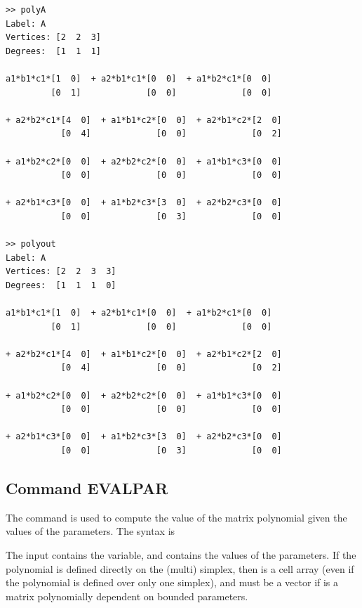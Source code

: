 \documentclass[english,11pt]{article}
\theoremstyle{break} \theorembodyfont{\small\rm}
\begin{document}
\begin{minipage}{13.5cm}
\begin{lstlisting}[rulecolor=\color{red}]
>> polyA
Label: A
Vertices: [2  2  3]
Degrees:  [1  1  1]

a1*b1*c1*[1  0]  + a2*b1*c1*[0  0]  + a1*b2*c1*[0  0]
         [0  1]             [0  0]             [0  0]

+ a2*b2*c1*[4  0]  + a1*b1*c2*[0  0]  + a2*b1*c2*[2  0]
           [0  4]             [0  0]             [0  2]

+ a1*b2*c2*[0  0]  + a2*b2*c2*[0  0]  + a1*b1*c3*[0  0]
           [0  0]             [0  0]             [0  0]

+ a2*b1*c3*[0  0]  + a1*b2*c3*[3  0]  + a2*b2*c3*[0  0]
           [0  0]             [0  3]             [0  0]

>> polyout
Label: A
Vertices: [2  2  3  3]
Degrees:  [1  1  1  0]

a1*b1*c1*[1  0]  + a2*b1*c1*[0  0]  + a1*b2*c1*[0  0]
         [0  1]             [0  0]             [0  0]

+ a2*b2*c1*[4  0]  + a1*b1*c2*[0  0]  + a2*b1*c2*[2  0]
           [0  4]             [0  0]             [0  2]

+ a1*b2*c2*[0  0]  + a2*b2*c2*[0  0]  + a1*b1*c3*[0  0]
           [0  0]             [0  0]             [0  0]

+ a2*b1*c3*[0  0]  + a1*b2*c3*[3  0]  + a2*b2*c3*[0  0]
           [0  0]             [0  3]             [0  0]
\end{lstlisting}
\end{minipage}
\vspace{0.2cm}




\subsection*{Command EVALPAR}

The command  is used to compute the value of the matrix polynomial
given the values of the parameters. The syntax is

\vspace{0.5cm}%
\noindent\begin{minipage}{\linewidth}
\end{minipage}
\vspace{0.2cm}

The input  contains the  variable, and  contains
the values of the parameters. If the polynomial is defined directly on the (multi) simplex,
then  is a cell array (even if the polynomial is defined over only one simplex),
and  must be a vector if  is a matrix polynomially dependent on
bounded parameters.
\end{document}
